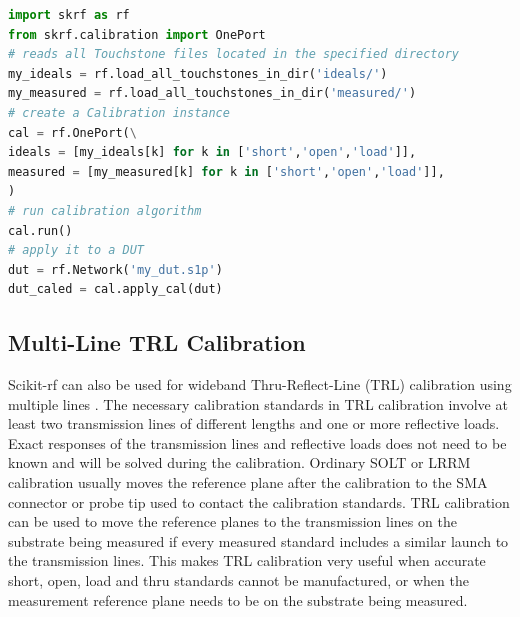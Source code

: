 \documentclass[journal, onecolumn]{IEEEtran}
\begin{document}
\begin{lstlisting}[language=Python]
import skrf as rf
from skrf.calibration import OnePort
# reads all Touchstone files located in the specified directory
my_ideals = rf.load_all_touchstones_in_dir('ideals/')
my_measured = rf.load_all_touchstones_in_dir('measured/')
# create a Calibration instance
cal = rf.OnePort(\
ideals = [my_ideals[k] for k in ['short','open','load']],
measured = [my_measured[k] for k in ['short','open','load']],
)
# run calibration algorithm
cal.run()
# apply it to a DUT
dut = rf.Network('my_dut.s1p')
dut_caled = cal.apply_cal(dut)
\end{lstlisting}


\subsection{Multi-Line TRL Calibration}
Scikit-rf can also be used for wideband Thru-Reflect-Line (TRL) calibration using multiple lines \cite{marks1991}. The necessary calibration standards in TRL calibration involve at least two transmission lines of different lengths and one or more reflective loads. Exact responses of the transmission lines and reflective loads does not need to be known and will be solved during the calibration. Ordinary SOLT or LRRM \cite{davidson1990} calibration usually moves the reference plane after the calibration to the SMA connector or probe tip used to contact the calibration standards. TRL calibration can be used to move the reference planes to the transmission lines on the substrate being measured if every measured standard includes a similar launch to the transmission lines. This makes TRL calibration very useful when accurate short, open, load and thru standards cannot be manufactured, or when the measurement reference plane needs to be on the substrate being measured. 
\end{document}
